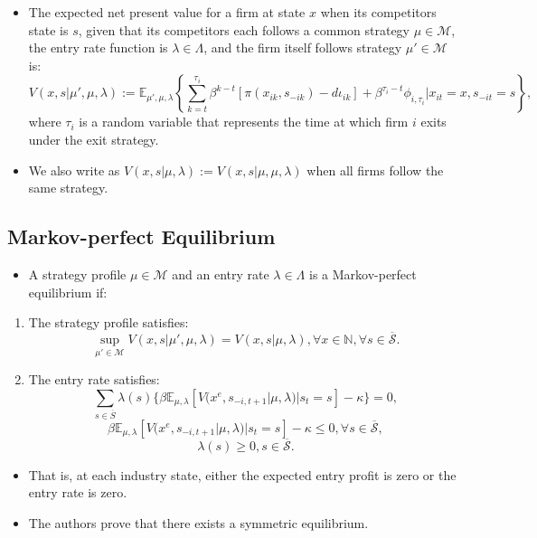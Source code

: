 \documentclass[
]{book}
\providecommand{\tightlist}{%
  \setlength{\itemsep}{0pt}\setlength{\parskip}{0pt}}
\begin{document}
\begin{itemize}
\tightlist
\item
  The expected net present value for a firm at state \(x\) when its
  competitors state is \(s\), given that its competitors each follows a
  common strategy \(\mu \in \mathcal{M}\), the entry rate function is
  \(\lambda \in \Lambda\), and the firm itself follows strategy
  \(\mu' \in \mathcal{M}\) is: \[
  V(x, s|\mu', \mu, \lambda) := \mathbb{E}_{\mu', \mu, \lambda}\left\{\sum_{k = t}^{\tau_i} \beta^{k - t}[\pi(x_{ik}, s_{-ik}) - d \iota_{ik}] + \beta^{\tau_i - t} \phi_{i, \tau_i}|x_{it} = x, s_{-it} = s\right\},
  \] where \(\tau_i\) is a random variable that represents the time at
  which firm \(i\) exits under the exit strategy.
\item
  We also write as \(V(x, s|\mu, \lambda) := V(x, s|\mu, \mu, \lambda)\)
  when all firms follow the same strategy.
\end{itemize}

\hypertarget{markov-perfect-equilibrium-2}{%
\subsection{Markov-perfect Equilibrium}\label{markov-perfect-equilibrium-2}}

\begin{itemize}
\tightlist
\item
  A strategy profile \(\mu \in \mathcal{M}\) and an entry rate
  \(\lambda \in \Lambda\) is a Markov-perfect equilibrium if:
\end{itemize}

\begin{enumerate}
\def\labelenumi{\arabic{enumi}.}
\tightlist
\item
  The strategy profile satisfies: \[
  \sup_{\mu' \in \mathcal{M}} V(x, s|\mu', \mu, \lambda) = V(x, s|\mu, \lambda), \forall x \in \mathbb{N}, \forall s \in \overline{\mathcal{S}}.
  \]
\item
  The entry rate satisfies: \[
  \sum_{s \in \overline{S}} \lambda(s) \{\beta \mathbb{E}_{\mu, \lambda}[V(x^e, s_{-i, t + 1}|\mu, \lambda)|s_t = s] - \kappa\}
   = 0,
   \] \[
   \beta \mathbb{E}_{\mu, \lambda}[V(x^e, s_{-i, t + 1}|\mu, \lambda)|s_t = s] - \kappa \le 0, \forall s \in \mathcal{\overline{S}},
   \] \[
   \lambda(s) \ge 0,s \in \mathcal{\overline{S}}.
   \]
\end{enumerate}

\begin{itemize}
\tightlist
\item
  That is, at each industry state, either the expected entry profit is
  zero or the entry rate is zero.
\item
  The authors prove that there exists a symmetric equilibrium.
\end{itemize}
\end{document}

